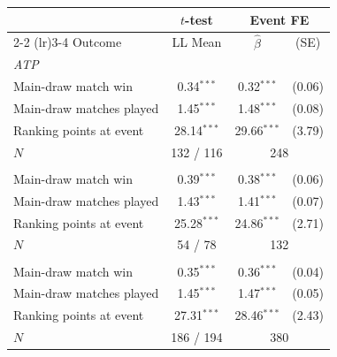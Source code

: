\begin{tabular}{l ccc}
\toprule
 & $t$-test & \multicolumn{2}{c}{Event FE} \\
\cmidrule(lr){2-2} \cmidrule(lr){3-4}
Outcome & LL Mean & $\hat{\beta}$ & (SE) \\
\midrule
\multicolumn{4}{l}{\textit{ATP}} \\
\quad Main-draw match win & 0.34$^{***}$ & 0.32$^{***}$ & (0.06) \\
\quad Main-draw matches played & 1.45$^{***}$ & 1.48$^{***}$ & (0.08) \\
\quad Ranking points at event & 28.14$^{***}$ & 29.66$^{***}$ & (3.79) \\
\quad $N$ & \multicolumn{1}{c}{132 / 116} & \multicolumn{2}{c}{248} \\
\addlinespace
\multicolumn{4}{l}{\textit{WTA}} \\
\quad Main-draw match win & 0.39$^{***}$ & 0.38$^{***}$ & (0.06) \\
\quad Main-draw matches played & 1.43$^{***}$ & 1.41$^{***}$ & (0.07) \\
\quad Ranking points at event & 25.28$^{***}$ & 24.86$^{***}$ & (2.71) \\
\quad $N$ & \multicolumn{1}{c}{54 / 78} & \multicolumn{2}{c}{132} \\
\addlinespace
\multicolumn{4}{l}{\textit{Pooled}} \\
\quad Main-draw match win & 0.35$^{***}$ & 0.36$^{***}$ & (0.04) \\
\quad Main-draw matches played & 1.45$^{***}$ & 1.47$^{***}$ & (0.05) \\
\quad Ranking points at event & 27.31$^{***}$ & 28.46$^{***}$ & (2.43) \\
\quad $N$ & \multicolumn{1}{c}{186 / 194} & \multicolumn{2}{c}{380} \\
\bottomrule
\end{tabular}
